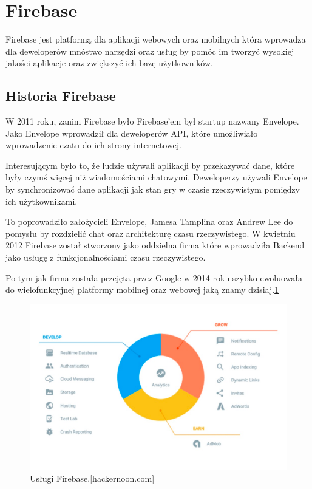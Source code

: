 \section{Firebase}

Firebase jest platformą dla aplikacji webowych oraz mobilnych która wprowadza
dla deweloperów mnóstwo narzędzi oraz usług by pomóc im tworzyć wysokiej jakości aplikacje oraz zwiększyć ich bazę użytkowników.

\subsection{Historia Firebase}

W 2011 roku, zanim Firebase było Firebase’em był startup nazwany Envelope.
Jako Envelope  wprowadził dla deweloperów API, które umożliwiało wprowadzenie czatu do ich strony internetowej.

Interesującym było to, że ludzie używali aplikacji by przekazywać dane, które były czymś więcej niż wiadomościami chatowymi.
Deweloperzy używali Envelope by synchronizować dane aplikacji jak stan gry w czasie rzeczywistym pomiędzy ich użytkownikami.

To poprowadziło założycieli Envelope, Jamesa Tamplina oraz Andrew Lee do pomysłu by rozdzielić chat oraz architekturę czasu rzeczywistego.
W kwietniu 2012 Firebase został stworzony jako oddzielna firma które wprowadziła Backend jako usługę z funkcjonalnościami czasu rzeczywistego. 

Po tym jak firma została przejęta przez Google w 2014 roku szybko ewoluowała do wielofunkcyjnej platformy mobilnej oraz webowej jaką znamy dzisiaj.\ref{rys:firebase}

\begin{figure}
\centering\includegraphics[width=.6\textwidth]{img/firebase}
\caption{Usługi Firebase.[hackernoon.com]}\label{rys:firebase}%
\end{figure}

